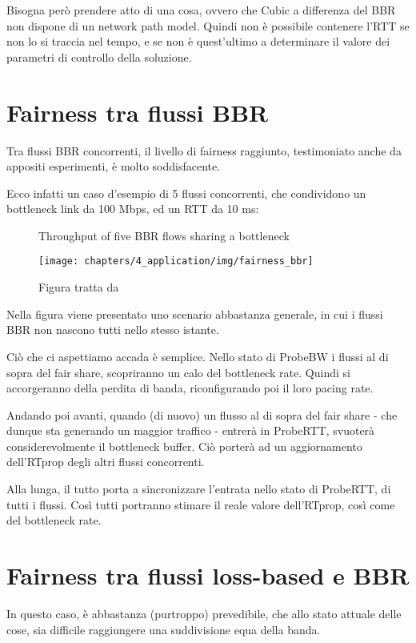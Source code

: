 Bisogna però prendere atto di una cosa, ovvero che Cubic a differenza del BBR non dispone di un network path model. Quindi non è possibile contenere l'RTT se non lo si traccia nel tempo, e se non è quest'ultimo a determinare il valore dei parametri di controllo della soluzione.

\section{Fairness tra flussi BBR}

Tra flussi BBR concorrenti, il livello di fairness raggiunto, testimoniato anche da appositi esperimenti, è molto soddisfacente. \bigskip

Ecco infatti un caso d'esempio di 5 flussi concorrenti, che condividono un bottleneck link da 100 Mbps, ed un RTT da 10 ms:

\begin{figure}[H]

\center
\caption{Throughput of five BBR flows sharing a bottleneck}
\texttt{[image: chapters/4\_application/img/fairness\_bbr]}
\caption*{Figura tratta da \cite[p.~64]{Cardwell:2017:BCC:3042068.3009824}}

\end{figure}

Nella figura viene presentato uno scenario abbastanza generale, in cui i flussi BBR non nascono tutti nello stesso istante. \bigskip

Ciò che ci aspettiamo accada è semplice. Nello stato di ProbeBW i flussi al di sopra del fair share, scopriranno un calo del bottleneck rate. Quindi si accorgeranno della perdita di banda, riconfigurando poi il loro pacing rate. \bigskip

Andando poi avanti, quando (di nuovo) un flusso al di sopra del fair share - che dunque sta generando un maggior traffico - entrerà in ProbeRTT, svuoterà considerevolmente il bottleneck buffer. Ciò porterà ad un aggiornamento dell'RTprop degli altri flussi concorrenti. \bigskip

Alla lunga, il tutto porta a sincronizzare l'entrata nello stato di ProbeRTT, di tutti i flussi. Così tutti portranno stimare il reale valore dell'RTprop, così come del bottleneck rate.

\section{Fairness tra flussi loss-based e BBR}

In questo caso, è abbastanza (purtroppo) prevedibile, che allo stato attuale delle cose, sia difficile raggiungere una suddivisione equa della banda. \bigskip


